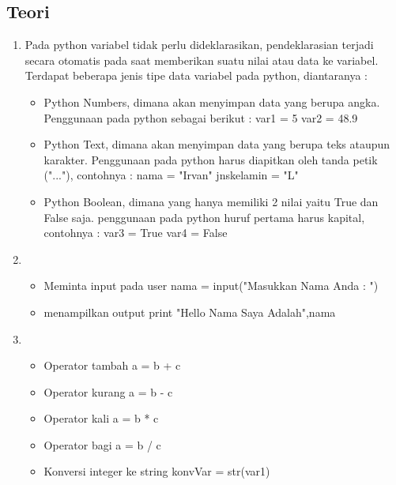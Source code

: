 	\subsection{Teori}
		\begin{enumerate}
			\item Pada python variabel tidak perlu dideklarasikan, pendeklarasian terjadi secara otomatis pada saat memberikan suatu nilai atau data ke variabel. Terdapat beberapa jenis tipe data variabel pada python, diantaranya :
				\begin{itemize}
					\item Python Numbers, dimana akan menyimpan data yang berupa angka. Penggunaan pada python sebagai berikut : 
					var1 = 5
					var2 = 48.9
					
					\item Python Text, dimana akan menyimpan data yang berupa teks ataupun karakter. Penggunaan pada python harus diapitkan oleh tanda petik ("..."), contohnya :
					nama = "Irvan"
					jnskelamin = "L"
					
					\item Python Boolean, dimana yang hanya memiliki 2 nilai yaitu True dan False saja. penggunaan pada python huruf pertama harus kapital, contohnya :
					var3 = True
					var4 = False
				\end{itemize}

			\item \begin{itemize}
					\item Meminta input pada user
					nama = input("Masukkan Nama Anda : ")
					
					\item menampilkan output
					print "Hello Nama Saya Adalah",nama
				\end{itemize}

			\item \begin{itemize}
					\item Operator tambah
					a = b + c
					
					\item Operator kurang
					a = b - c
					
					\item Operator kali
					a = b * c
					
					\item Operator bagi
					a = b / c
					
					\item Konversi integer ke string
					konvVar = str(var1)
					

\end{itemize}
\end{enumerate}
